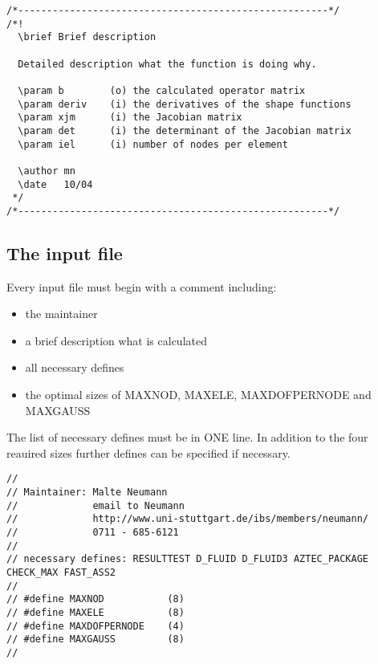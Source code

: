 \begin{verbatim}
/*------------------------------------------------------*/
/*!
  \brief Brief description

  Detailed description what the function is doing why.

  \param b        (o) the calculated operator matrix
  \param deriv    (i) the derivatives of the shape functions
  \param xjm      (i) the Jacobian matrix
  \param det      (i) the determinant of the Jacobian matrix
  \param iel      (i) number of nodes per element

  \author mn
  \date   10/04
 */
/*------------------------------------------------------*/
\end{verbatim}

\subsection{The input file}

Every input file must begin with a comment including: 

\begin{itemize}
\item the maintainer
\item a brief description what is calculated
\item all necessary defines
\item the optimal sizes of MAXNOD, MAXELE, MAXDOFPERNODE and MAXGAUSS
\end{itemize}

The list of necessary defines must be in ONE line. In addition to the
four reauired sizes further defines can be specified if necessary.  

\begin{verbatim}
//
// Maintainer: Malte Neumann
//             email to Neumann
//             http://www.uni-stuttgart.de/ibs/members/neumann/
//             0711 - 685-6121
//
// necessary defines: RESULTTEST D_FLUID D_FLUID3 AZTEC_PACKAGE CHECK_MAX FAST_ASS2
//
// #define MAXNOD           (8)
// #define MAXELE           (8)
// #define MAXDOFPERNODE    (4)
// #define MAXGAUSS         (8)
//
\end{verbatim}
